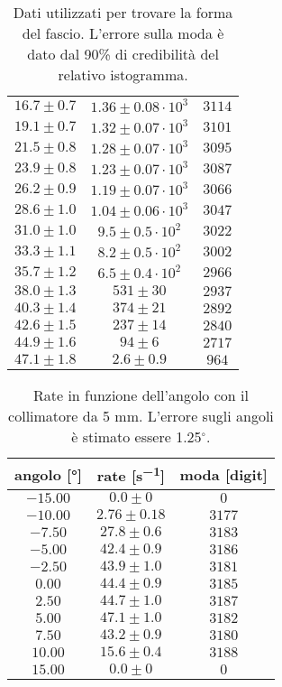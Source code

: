 \begin{table}[h]
\begin{tabular}{c|c|c}
$ 16.7 \pm 0.7 $ & $ 1.36 \pm 0.08  \cdot 10^{3} $ & $ 3114 $ \\ 
$ 19.1 \pm 0.7 $ & $ 1.32 \pm 0.07  \cdot 10^{3} $ & $ 3101 $ \\ 
$ 21.5 \pm 0.8 $ & $ 1.28 \pm 0.07  \cdot 10^{3} $ & $ 3095 $ \\ 
$ 23.9 \pm 0.8 $ & $ 1.23 \pm 0.07  \cdot 10^{3} $ & $ 3087 $ \\ 
$ 26.2 \pm 0.9 $ & $ 1.19 \pm 0.07  \cdot 10^{3} $ & $ 3066 $ \\ 
$ 28.6 \pm 1.0 $ & $ 1.04 \pm 0.06  \cdot 10^{3} $ & $ 3047 $ \\ 
$ 31.0 \pm 1.0 $ & $ 9.5 \pm 0.5    \cdot 10^{2} $ & $ 3022 $ \\ 
$ 33.3 \pm 1.1 $ & $ 8.2 \pm 0.5    \cdot 10^{2} $ & $ 3002 $ \\ 
$ 35.7 \pm 1.2 $ & $ 6.5 \pm 0.4    \cdot 10^{2} $ & $ 2966 $ \\ 
$ 38.0 \pm 1.3 $ & $ 531 \pm 30 $ & $ 2937 $ \\ 
$ 40.3 \pm 1.4 $ & $ 374 \pm 21 $ & $ 2892 $ \\ 
$ 42.6 \pm 1.5 $ & $ 237 \pm 14 $ & $ 2840 $ \\ 
$ 44.9 \pm 1.6 $ & $ 94 \pm 6 $ & $ 2717 $ \\ 
$ 47.1 \pm 1.8 $ & $ 2.6 \pm 0.9 $ & $ 964 $ \\ 
\end{tabular}

\caption{Dati utilizzati per trovare la forma del fascio. L'errore sulla moda è dato dal 90\% di credibilità del relativo istogramma.}
\label{tab:forma}
\end{table}


\begin{table}[h]
\centering

\begin{tabular}{c|c|c}
angolo [\si{\degree}] & rate  [\si{s^{-1}}] & moda [digit] \\
\hline
$ -15.00 $ & $ 0.0 \pm 0 $ & $ 0 $ \\ 
$ -10.00 $ & $ 2.76 \pm 0.18 $ & $ 3177 $ \\ 
$ -7.50 $ & $ 27.8 \pm 0.6 $ & $ 3183 $ \\ 
$ -5.00 $ & $ 42.4 \pm 0.9 $ & $ 3186 $ \\ 
$ -2.50 $ & $ 43.9 \pm 1.0 $ & $ 3181 $ \\ 
$ 0.00 $ & $ 44.4 \pm 0.9 $ & $ 3185 $ \\ 
$ 2.50 $ & $ 44.7 \pm 1.0 $ & $ 3187 $ \\ 
$ 5.00 $ & $ 47.1 \pm 1.0 $ & $ 3182 $ \\ 
$ 7.50 $ & $ 43.2 \pm 0.9 $ & $ 3180 $ \\ 
$ 10.00 $ & $ 15.6 \pm 0.4 $ & $ 3188 $ \\ 
$ 15.00 $ & $ 0.0 \pm 0 $ & $ 0 $ \\ 

\end{tabular}

\caption{Rate in funzione dell'angolo con il collimatore da 5\! mm.
		L'errore sugli angoli è stimato essere 1.25$^{\circ}$.}
\label{tab:coll5}
\end{table}




